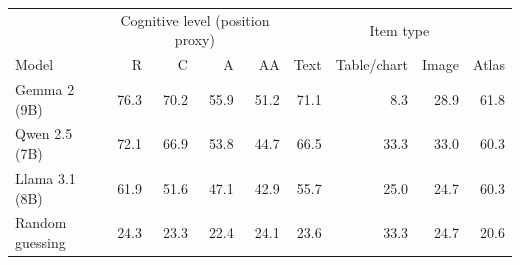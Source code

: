 \begin{tabular}{@{}lrrrrrrrr@{}}
\toprule
 & \multicolumn{4}{c}{Cognitive level (position proxy)} & \multicolumn{4}{c}{Item type} \\
Model & R & C & A & AA & Text & Table/chart & Image & Atlas \\
\midrule
Gemma 2 (9B) & 76.3 & 70.2 & 55.9 & 51.2 & 71.1 & 8.3 & 28.9 & 61.8 \\
Qwen 2.5 (7B) & 72.1 & 66.9 & 53.8 & 44.7 & 66.5 & 33.3 & 33.0 & 60.3 \\
Llama 3.1 (8B) & 61.9 & 51.6 & 47.1 & 42.9 & 55.7 & 25.0 & 24.7 & 60.3 \\
Random guessing & 24.3 & 23.3 & 22.4 & 24.1 & 23.6 & 33.3 & 24.7 & 20.6 \\
\bottomrule
\end{tabular}
